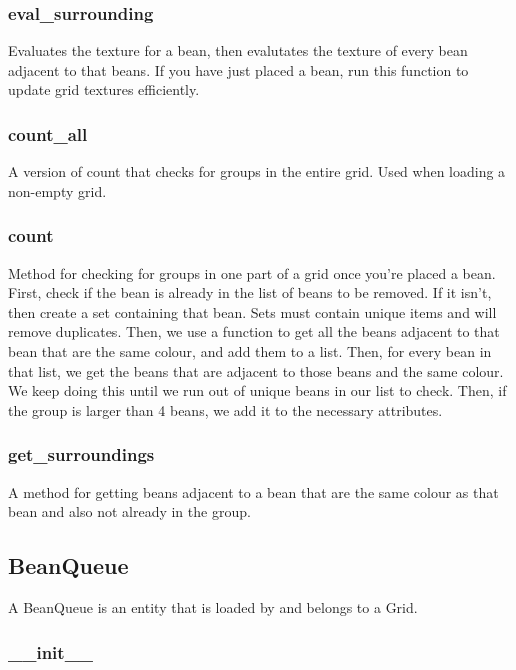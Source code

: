 \documentclass{report}
\begin{document}
\subsubsection{eval\_surrounding}

Evaluates the texture for a bean, then evalutates the texture of every bean adjacent to that beans. If you have just placed a bean, run this function to update grid textures efficiently.

\subsubsection{count\_all}

A version of count that checks for groups in the entire grid. Used when loading a non-empty grid.

\subsubsection{count}

Method for checking for groups in one part of a grid once you're placed a bean. First, check if the bean is already in the list of beans to be removed. If it isn't, then create a set containing that bean. Sets must contain unique items and will remove duplicates. Then, we use a function to get all the beans adjacent to that bean that are the same colour, and add them to a list. Then, for every bean in that list, we get the beans that are adjacent to those beans and the same colour. We keep doing this until we run out of unique beans in our list to check.  Then, if the group is larger than 4 beans, we add it to the necessary attributes.

\subsubsection{get\_surroundings}

A method for getting beans adjacent to a bean that are the same colour as that bean and also not already in the group.

\subsection{BeanQueue}

A BeanQueue is an entity that is loaded by and belongs to a Grid.

\subsubsection{\_\_init\_\_}
\end{document}
